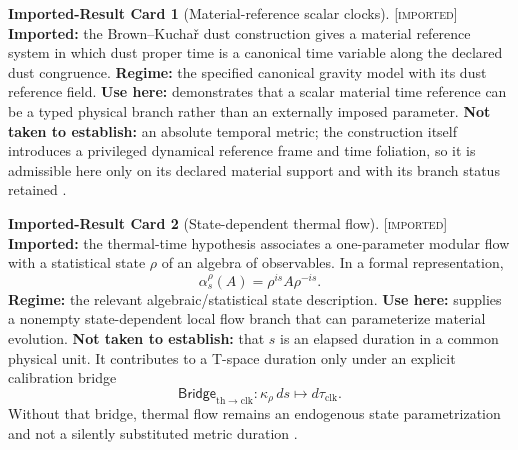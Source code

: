 \documentclass[11pt]{article}
\newcommand{\Imp}{\textsc{[imported]}}
\theoremstyle{definition}
\newtheorem{scard}{Imported-Result Card}
\begin{document}
\begin{scard}[Material-reference scalar clocks]
\label{card:tspace-material-reference}
\Imp{} \textbf{Imported:} the Brown--Kucha\v{r} dust construction gives a material
reference system in which dust proper time is a canonical time variable along the
declared dust congruence. \textbf{Regime:} the specified canonical gravity model
with its dust reference field. \textbf{Use here:} demonstrates that a scalar
material time reference can be a typed physical branch rather than an externally
imposed parameter. \textbf{Not taken to establish:} an absolute temporal metric;
the construction itself introduces a privileged dynamical reference frame and time
foliation, so it is admissible here only on its declared material support and with
its branch status retained \cite{S_BrownKuchar1995}.
\end{scard}

\begin{scard}[State-dependent thermal flow]
\label{card:tspace-thermal-flow}
\Imp{} \textbf{Imported:} the thermal-time hypothesis associates a one-parameter
modular flow with a statistical state $\rho$ of an algebra of observables. In a
formal representation,
\begin{equation}
\alpha_s^{\rho}(A)=\rho^{is}A\rho^{-is}.
\label{eq:tspace-thermal-flow}
\end{equation}
\textbf{Regime:} the relevant algebraic/statistical state description.
\textbf{Use here:} supplies a nonempty state-dependent local flow branch that can
parameterize material evolution. \textbf{Not taken to establish:} that $s$ is an
elapsed duration in a common physical unit. It contributes to a T-space duration
only under an explicit calibration bridge
\begin{equation}
\mathsf{Bridge}_{\mathrm{th}\to\mathrm{clk}}:
\kappa_\rho\,ds\longmapsto d\tau_{\mathrm{clk}}.
\label{eq:tspace-thermal-calibration}
\end{equation}
Without that bridge, thermal flow remains an endogenous state parametrization and
not a silently substituted metric duration \cite{S_ConnesRovelli1994}.
\end{scard}
\end{document}
